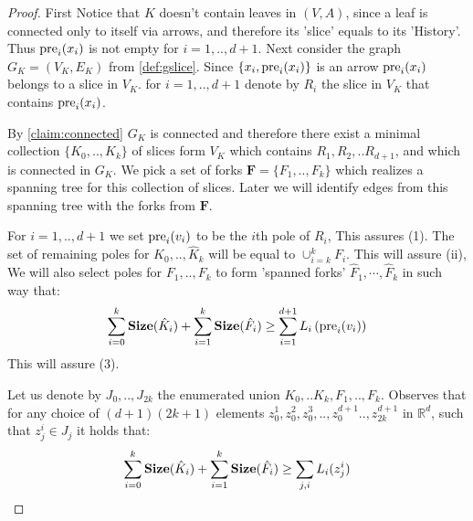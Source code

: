   \begin{proof}
    First Notice that $K$ doesn't contain leaves in $(V,A)$, since a leaf is connected only to itself via arrows, and therefore its 'slice' equals to its 'History'. Thus $\text{pre}_{i}(x_{i})$ is not empty for $i=1,..,d+1$. Next consider the graph $G_{K}= (V_{K},E_{K})$ from \cref{def:gslice}. Since $\{ x_{i}, \text{pre}_{i}(x_{i}) \}$ is an arrow $\text{pre}_{i}(x_{i})$ belongs to a slice in $V_{K}$. for $i=1,..,d+1$ denote by $R_{i}$ the slice in $V_{K}$ that contains $\text{pre}_{i}(x_i)$. 

    By \cref{claim:connected} $G_{K}$ is connected and therefore there exist a minimal collection $\{K_{0},..,K_{k}\}$ of slices form $V_{K}$ which contains $R_{1},R_{2},..R_{d+1}$, and which is connected in $G_{K}$. We pick a set of forks $\mathbf{F} = \{F_{1},..,F_{k} \}$ which realizes a spanning tree for this collection of slices. Later we will identify edges from this spanning tree with the forks from $\mathbf{F}$.  

    For $i=1,..,d+1$ we set $\text{pre}_{i}(v_{i})$ to be the $i$th pole of $R_{i}$, This assures (1). The set of remaining poles for $\hat{K}_0, ..,\hat{K}_{k}$ will be equal to $\cup^{k}_{i=k}F_{i}$. This will assure (ii), We will also select poles for $F_{1}, ..,F_{k}$ to form 'spanned forks' $\hat{F}_{1}, \cdots,\hat{F}_{k}$ in such way that:  
    \begin{equation*}
      \begin{split}
        \sum^{k}_{i=0}\mathbf{Size}(\hat{K}_{i}) + \sum^{k}_{i=1}\mathbf{Size}(\hat{F}_{i}) \ge \sum_{i=1}^{d+1}L_{i}\left( \text{pre}_{i}(v_{i}) \right) 
      \end{split}
    \end{equation*}
    This will assure (3). 

    Let us denote by $J_{0},..,J_{2k}$ the enumerated union $K_{0},..K_{k},F_{1},..,F_{k}$. Observes that for any choice of $(d+1)(2k+1)$ elements $z_{0}^{1},z_{0}^{2}, z_{0}^{3},..,z_{0}^{d+1}..,z_{2k}^{d+1}$ in $\mathbb{R}^{d}$, such that $z_{j}^{i} \in J_{j}$ it holds that:
    \begin{equation}
      \label{equ:spanlow}
      \begin{split}
         \sum^{k}_{i=0}\mathbf{Size}(\hat{K}_{i}) + \sum^{k}_{i=1}\mathbf{Size}(\hat{F}_{i})  \ge \sum_{j,i}L_{i}(z_{j}^{i})
      \end{split}
    \end{equation}


\end{proof}
